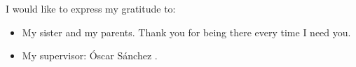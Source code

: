 
\cleardoublepage


\begin{acknowledgements}

I would like to express my gratitude to:
\begin{itemize}
	\item My sister and my parents. Thank you for being there every time I need you.
\end{itemize}

\begin{itemize}
 \item My supervisor: Óscar Sánchez .
 \vspace*{3mm}
\end{itemize}

\end{acknowledgements}

